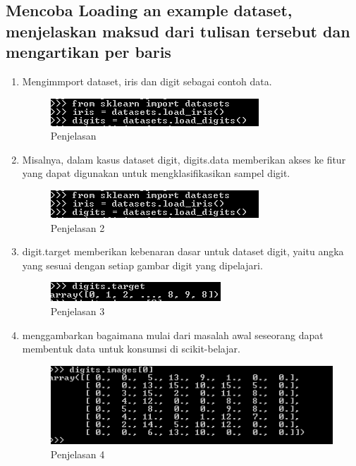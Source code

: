 \subsection{Mencoba Loading an example dataset, menjelaskan maksud dari tulisan tersebut dan mengartikan per baris}
\begin{enumerate}
\item
Mengimmport dataset, iris dan digit sebagai contoh data.
\begin{figure}
	\begin{center}
   	 \includegraphics[scale=1]{figures/penjelasan1.png}
   	 \caption{Penjelasan }	
	\end{center}
\end{figure}
\item
Misalnya, dalam kasus dataset digit, digits.data memberikan akses ke fitur yang dapat digunakan untuk mengklasifikasikan sampel digit.
\begin{figure}
	\begin{center}
   	 \includegraphics[scale=1]{figures/penjelasan1.png}
   	 \caption{Penjelasan 2}	
	\end{center}
\end{figure}
\item 
digit.target memberikan kebenaran dasar untuk dataset digit, yaitu angka yang sesuai dengan setiap gambar digit yang dipelajari.
\begin{figure}
	\begin{center}
   	 \includegraphics[scale=1]{figures/penjelasan3.png}
   	 \caption{Penjelasan 3}	
	\end{center}
\end{figure}
\item 
menggambarkan bagaimana mulai dari masalah awal seseorang dapat membentuk data untuk konsumsi di scikit-belajar.
\begin{figure}
	\begin{center}
   	 \includegraphics[scale=1]{figures/penjelasan4.png}
   	 \caption{Penjelasan 4}	
	\end{center}
\end{figure}

\end{enumerate}



